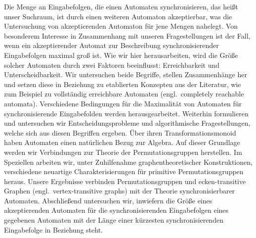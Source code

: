 Die Menge an Eingabefolgen, die einen Automaten synchronisieren, das heißt unser Suchraum, 
ist durch einen weiteren Automaton akzeptierbar, was die Untersuchung von akzeptierenden Automaton für jene Mengen nahelegt.
Von besonderem Interesse in Zusammenhang mit unseren Fragestellungen
ist der Fall, wenn ein akzeptierender Automat zur Beschreibung synchronisierender Eingabefolgen
maximal groß ist.
Wie wir hier herausarbeiten, wird die Größe solcher Automaten
durch zwei Faktoren beeinflusst: Erreichbarkeit und Unterscheidbarkeit.
Wir untersuchen beide Begriffe, stellen Zusammenhänge her
und setzen diese in Beziehung zu etablierten Kon\-zepten aus der Literatur, 
wie zum Beispiel zu
vollständig erreichbare Automaten (engl.~completely reachable automata).
Verschiedene Bedingungen für die Maximalität von Automaten für synchronisierende Eingabefolden
werden herausgearbeitet.
Weiterhin formulieren und untersuchen wir Entscheidungsprobleme und algorithmische Fragestellungen, 
welche sich aus diesen Begriffen ergeben.
Über ihren Transformationsmonoid haben Automaten einen natürlichen Bezug
zur Algebra.
Auf dieser Grundlage werden wir Verbindungen zur Theorie der Permutationsgruppen
herstellen. Im Speziellen
arbeiten wir, unter Zuhilfenahme graphentheoretischer Konstruktionen,
 verschiedene neuartige Charakterisierungen für primitive Permutationsgruppen heraus.
Unsere Ergebnisse verbinden Permutationsgruppen und ecken-transitive Graphen (engl.~vertex-transitive graphs) 
mit der Theorie synchronisierbarer Automaten.
Abschließend untersuchen wir, inwiefern die Größe eines akzeptierenden Automaten für die synchronisierenden Eingabefolgen
eines gegebenen Automaten mit der Länge einer kürzesten synchronisierenden Eingabefolge in Beziehung steht.

